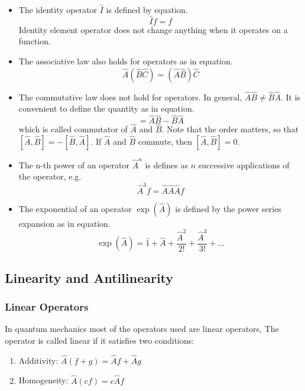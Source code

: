 \begin{itemize}
    \item The identity operator $\hat{I}$ is defined by equation.
        \begin{equation}
            \hat{I}f = f
            \label{eq:identity_operator}
        \end{equation}
          Identity element operator does not change anything when it operates on a function.
    \item The associative law also holds for operators as in equation.
        \begin{equation}
            \hat{A}(\hat{B}\hat{C}) = (\hat{A}\hat{B})\hat{C}
            \label{eq:associative_operator}
        \end{equation}
    \item The commutative law does not hold for operators. In general, $\hat{A}\hat{B} \neq \hat{B}\hat{A}$.  It is convenient to define the quantity as in equation.
        \begin{equation}
            [\hat{A}, \hat{B}] = \hat{A}\hat{B} - \hat{B}\hat{A}
            \label{eq:commutator_operator}
        \end{equation}
            which is called commutator of $\hat{A}$ and $\hat{B}$. Note that the order matters, so that $[\hat{A}, \hat{B}] = -[\hat{B}, \hat{A}]$. If $\hat{A}$ and $\hat{B}$ commute, then $[\hat{A}, \hat{B}] = 0$.
    \item The n-th power of an operator $\hat{A}^n$ is defines as $n$ successive applications of the operator, e.g.
        \begin{equation}
            \hat{A}^3f = \hat{A}\hat{A}\hat{A}f
            \label{eq:power_operator}
        \end{equation}
    \item The exponential of an operator $\exp(\hat{A})$ is defined by the power series expansion as in equation.
        \begin{equation}
            \exp(\hat{A}) = \hat{1} + \hat{A} + \frac{\hat{A}^2}{2!} + \frac{\hat{A}^3}{3!} + \ldots
            \label{eq:exponential_operator}
        \end{equation}
\end{itemize}

\subsection{Linearity and Antilinearity}
\subsubsection{Linear Operators}
In quantum mechanics most of the operators used are linear operators, The operator is called linear if it satisfies two conditions:
\begin{enumerate}
  \centering
  \item Additivity: $\hat{A}(f + g) = \hat{A}f + \hat{A}g$ 
    \label{eq:additivity}
  \item Homogeneity: $\hat{A}(cf) = c\hat{A}f$
    \label{eq:homogeneity}
\end{enumerate}

